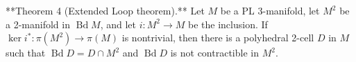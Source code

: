 **Theorem 4 (Extended Loop theorem).** Let $M$ be a PL 3-manifold, let $M^2$ be a 2-manifold in $\operatorname{Bd} M$, and let $i: M^2 \to M$ be the inclusion. If $\ker i^*: \pi(M^2) \to \pi(M)$ is nontrivial, then there is a polyhedral 2-cell $D$ in $M$ such that $\operatorname{Bd} D = D \cap M^2$ and $\operatorname{Bd} D$ is not contractible in $M^2$.
